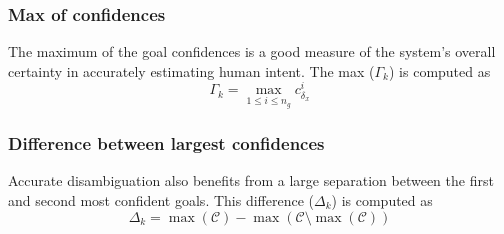 \documentclass[conference]{IEEEtran}
\newcommand{\argmax}{\arg\!\max}
\begin{document}
\subsubsection{Max of confidences}
The maximum of the goal confidences is a good measure of the system's overall certainty in accurately estimating human intent. 
The max ($\Gamma_{k}$) is computed as
\begin{equation*}
\Gamma_{k} =\max\limits_{1 \leq i \leq n_g}c^{i}_{\delta_x}
\end{equation*}
\subsubsection{Difference between largest confidences}
%
Accurate disambiguation also benefits from a large separation between the first and second most confident goals. 
This difference ($\Delta_{k}$) is computed as
\begin{equation*}
\Delta_{k} = \max(\mathcal{C}) - \max(\mathcal{C} \setminus {\max(\mathcal{C})})
\end{equation*}
\end{document}
